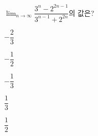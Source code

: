 $\displaystyle\lim_{n\to\infty}\dfrac{3^n-2^{2n-1}}{3^{n-1}+2^{2n}}$의 값은?
\begin{choices32}{\rule[-3ex]{0pt}{8ex}$-\dfrac{2}{3}$}{\rule[-3ex]{0pt}{8ex}$-\dfrac{1}{2}$}{\rule[-3ex]{0pt}{8ex}$-\dfrac{1}{3}$}{\rule[-3ex]{0pt}{8ex}$\dfrac{1}{3}$}{\rule[-3ex]{0pt}{8ex}$\dfrac{1}{2}$}\end{choices32}

